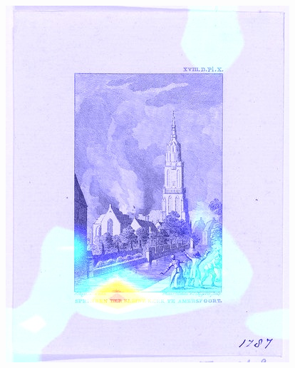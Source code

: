 \begin{figure}[!htb]
\endminipage
{}
  \includegraphics[width=\linewidth]{./Images/Chapter03/rijksnet_saliencies_1.jpeg}
\endminipage


\end{figure}
